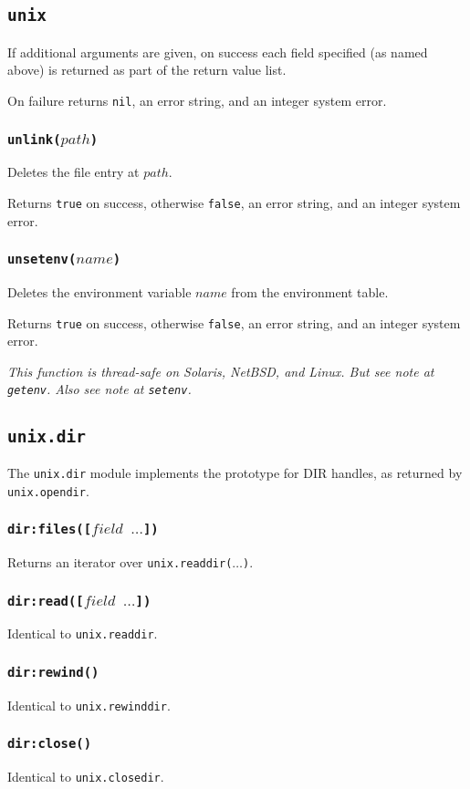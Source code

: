 \documentclass[11pt, oneside]{memoir}
\newcommand*{\true}[0]{\texttt{true}\xspace}
\newcommand*{\false}[0]{\texttt{false}\xspace}
\newcommand*{\nil}[0]{\texttt{nil}\xspace}
\newcommand*{\fn}[1]{\texttt{#1}\xspace}
\newcommand*{\module}[1]{\texttt{#1}\xspace}
\newcounter{toccols}
\newenvironment{Module}[1]{
	\subsection{\texttt{#1}}
	\addtocontents{toc}{
		\protect\begin{multicols}{\value{toccols}}
	}
}{
	\addtocontents{toc}{\protect\end{multicols}}
}
\begin{document}
\begin{Module}{unix}
If additional arguments are given, on success each field specified (as named above) is returned as part of the return value list.

On failure returns \nil, an error string, and an integer system error.

\subsubsection[\fn{unlink}]{\fn{unlink($path$)}}

Deletes the file entry at $path$.

Returns \true on success, otherwise \false, an error string, and an integer system error. 

\subsubsection[\fn{unsetenv}]{\fn{unsetenv($name$)}}

Deletes the environment variable $name$ from the environment table.

Returns \true on success, otherwise \false, an error string, and an integer system error.

\emph{This function is thread-safe on Solaris, NetBSD, and Linux. But see note at \fn{getenv}. Also see note at \fn{setenv}.}

\end{Module}

\begin{Module}{unix.dir}

The \module{unix.dir} module implements the prototype for DIR handles, as returned by \fn{unix.opendir}.

\subsubsection[\fn{dir:files}]{\fn{dir:files([$field$ $\ldots$])}}

Returns an iterator over \fn{unix.readdir($\ldots$)}.

\subsubsection[\fn{dir:read}]{\fn{dir:read([$field$ $\ldots$])}}

Identical to \fn{unix.readdir}.

\subsubsection[\fn{dir:rewind}]{\fn{dir:rewind()}}

Identical to \fn{unix.rewinddir}.

\subsubsection[\fn{dir:close}]{\fn{dir:close()}}

Identical to \fn{unix.closedir}.

\end{Module}
\end{document}
